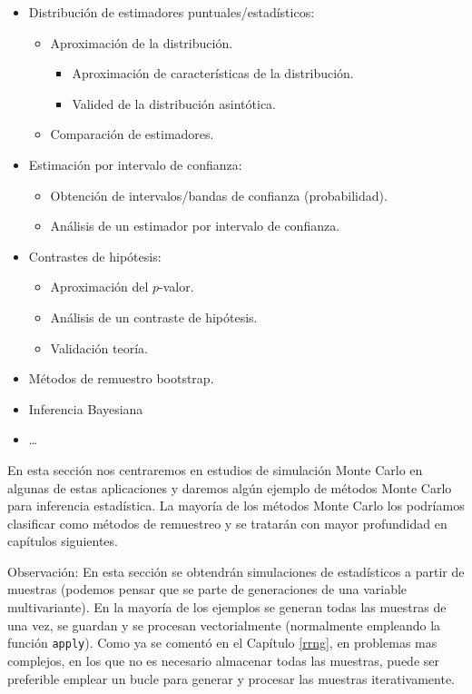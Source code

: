\documentclass[
  spanish,
  10pt,
]{book}
\theoremstyle{break}
\theoremstyle{nonumberplain}
\begin{document}
\begin{itemize}
\item
  Distribución de estimadores puntuales/estadísticos:

  \begin{itemize}
  \item
    Aproximación de la distribución.

    \begin{itemize}
    \item
      Aproximación de características de la distribución.
    \item
      Valided de la distribución asintótica.
    \end{itemize}
  \item
    Comparación de estimadores.
  \end{itemize}
\item
  Estimación por intervalo de confianza:

  \begin{itemize}
  \item
    Obtención de intervalos/bandas de confianza (probabilidad).
  \item
    Análisis de un estimador por intervalo de confianza.
  \end{itemize}
\item
  Contrastes de hipótesis:

  \begin{itemize}
  \item
    Aproximación del \(p\)-valor.
  \item
    Análisis de un contraste de hipótesis.
  \item
    Validación teoría.
  \end{itemize}
\item
  Métodos de remuestro bootstrap.
\item
  Inferencia Bayesiana
\item
  \ldots{}
\end{itemize}

En esta sección nos centraremos en estudios de simulación Monte Carlo en algunas de estas aplicaciones y daremos algún ejemplo de métodos Monte Carlo para inferencia estadística.
La mayoría de los métodos Monte Carlo los podríamos clasificar como métodos de remuestreo y se tratarán con mayor profundidad en capítulos siguientes.

Observación:
En esta sección se obtendrán simulaciones de estadísticos a partir de muestras (podemos pensar que se parte de generaciones de una variable multivariante).
En la mayoría de los ejemplos se generan todas las muestras de una vez, se guardan y se procesan vectorialmente (normalmente empleando la función \texttt{apply}).
Como ya se comentó en el Capítulo \ref{rrng}, en problemas mas complejos, en los que no es necesario almacenar todas las muestras, puede ser preferible emplear un bucle para generar y procesar las muestras iterativamente.
\end{document}
